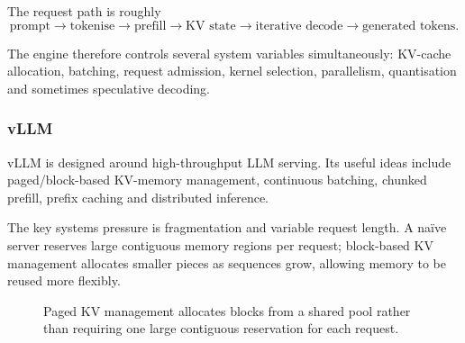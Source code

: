 The request path is roughly
\[
\text{prompt}
\rightarrow
\text{tokenise}
\rightarrow
\text{prefill}
\rightarrow
\text{KV state}
\rightarrow
\text{iterative decode}
\rightarrow
\text{generated tokens}.
\]

The engine therefore controls several system variables simultaneously:
KV-cache allocation, batching, request admission, kernel selection, parallelism, quantisation and sometimes speculative decoding.

\subsubsection*{vLLM}

vLLM is designed around high-throughput LLM serving.
Its useful ideas include paged/block-based KV-memory management, continuous batching, chunked prefill, prefix caching and distributed inference.

The key systems pressure is fragmentation and variable request length.
A naïve server reserves large contiguous memory regions per request; block-based KV management allocates smaller pieces as sequences grow, allowing memory to be reused more flexibly.

\begin{figure}[ht]
\centering
{}
\caption{Paged KV management allocates blocks from a shared pool rather than requiring one large contiguous reservation for each request.}
\label{fig:paged-kv}
\end{figure}

